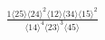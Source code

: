 \documentclass[varwidth, border=5pt]{standalone}
\begin{document}
\begin{my}
$\begin{gathered}
\scriptscriptstyle\frac{1⟨25⟩⟨24⟩^2⟨12⟩⟨34⟩⟨15⟩^2}{⟨14⟩^4⟨23⟩^3⟨45⟩}
\end{gathered}$
\end{my}
\end{document}
